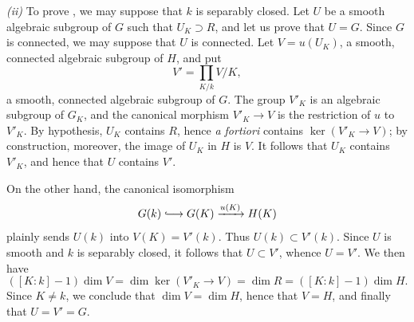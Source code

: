 \smallskip
\noindent\textit{(ii)} To prove , we may suppose that \(k\)
is separably closed.  Let \(U\) be a smooth algebraic subgroup of
\(G\) such that \(U_K\supset R\), and let us prove that \(U=G\).
Since \(G\) is connected, we may suppose that \(U\) is connected.
Let \(V=u(U_K)\), a smooth, connected algebraic subgroup of
\(H\), and put
\[
  V'=\prod_{K/k}V/K,
\]
a smooth, connected algebraic subgroup of \(G\).  The group
\(V'_K\) is an algebraic subgroup of \(G_K\), and the canonical
morphism \(V'_K\to V\) is the restriction of \(u\) to \(V'_K\).
By hypothesis, \(U_K\) contains \(R\), hence \emph{a fortiori}
contains \(\ker(V'_K\to V)\); by construction, moreover, the
image of \(U_K\) in \(H\) is \(V\).  It follows that \(U_K\)
contains \(V'_K\), and hence that \(U\) contains \(V'\).

On the other hand, the canonical isomorphism
\[
  G(k)\lhook\joinrel\longrightarrow G(K)
    \xrightarrow{u(K)}H(K)
\]
plainly sends \(U(k)\) into \(V(K)=V'(k)\).  Thus
\(U(k)\subset V'(k)\).  Since \(U\) is smooth and \(k\) is
separably closed, it follows that \(U\subset V'\), whence
\(U=V'\).  We then have
\[
  ([K:k]-1)\dim V
  =\dim\ker(V'_K\to V)
  =\dim R
  =([K:k]-1)\dim H.
\]
Since \(K\ne k\), we conclude that \(\dim V=\dim H\), hence that
\(V=H\), and finally that \(U=V'=G\).
